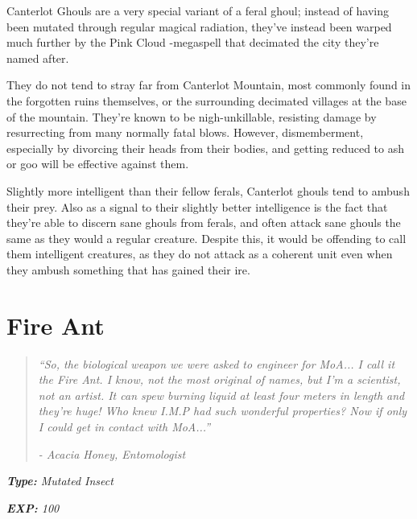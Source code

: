 \documentclass[11pt,a4paper,twocolumn]{book}
\begin{document}
	\bigskip
	Canterlot Ghouls are a very special variant of a feral ghoul; instead of having been mutated through regular magical radiation, they've instead been warped much further by the Pink Cloud -megaspell that decimated the city they're named after. 
	
	They do not tend to stray far from Canterlot Mountain, most commonly found in the forgotten ruins themselves, or the surrounding decimated villages at the base of the mountain. They're known to be nigh-unkillable, resisting damage by resurrecting from many normally fatal blows. However, dismemberment, especially by divorcing their heads from their bodies, and getting reduced to ash or goo will be effective against them. 
	
	Slightly more intelligent than their fellow ferals, Canterlot ghouls tend to ambush their prey. Also as a signal to their slightly better intelligence is the fact that they're able to discern sane ghouls from ferals, and often attack sane ghouls the same as they would a regular creature. Despite this, it would be offending to call them intelligent creatures, as they do not attack as a coherent unit even when they ambush something that has gained their ire.
	
	\clearpage
	
	\section*{Fire Ant}
	\begin{quote}
		\emph{``So, the biological weapon we were asked to engineer for MoA... I call it the Fire Ant. I know, not the most original of names, but I'm a scientist, not an artist. It can spew burning liquid at least four meters in length and they're huge! Who knew I.M.P had such wonderful properties? Now if only I could get in contact with MoA...''}
		
		\emph{-	Acacia Honey, Entomologist}
	\end{quote}
	
	\noindent
	\emph{\textbf{Type:} Mutated Insect}
	
	\noindent
	\emph{\textbf{EXP:} 100}
	
\end{document}
